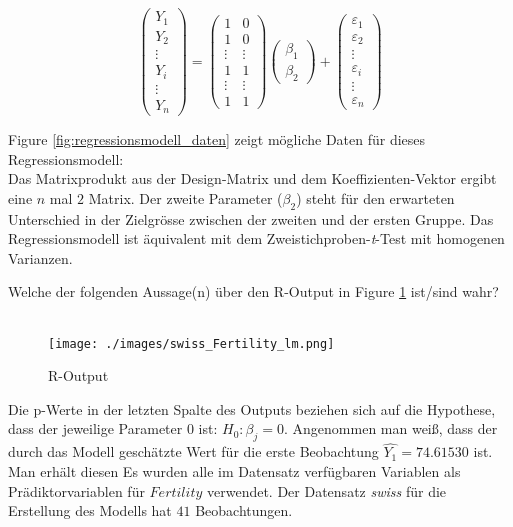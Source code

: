 \documentclass[10pt,addpoints]{exam}
\begin{document}
\begin{questions}
\[
\begin{pmatrix}
Y_1 \\
Y_2 \\
\vdots \\
Y_i \\
\vdots \\
Y_n
\end{pmatrix}
=
\begin{pmatrix}
1 & 0 \\
1 & 0 \\
\vdots & \vdots \\
1 & 1 \\
\vdots & \vdots \\
1 & 1
\end{pmatrix}
\begin{pmatrix}
\beta_1 \\
\beta_2
\end{pmatrix}
+
\begin{pmatrix}
\varepsilon_1 \\
\varepsilon_2 \\
\vdots \\
\varepsilon_i \\
\vdots \\
\varepsilon_n
\end{pmatrix}
\]

\begin{choices}
\choice Figure \ref{fig:regressionsmodell_daten} zeigt mögliche Daten für dieses Regressionsmodell:\\
\choice Das Matrixprodukt aus der Design-Matrix und dem Koeffizienten-Vektor ergibt eine $n$ mal $2$ Matrix.
\CorrectChoice Der zweite Parameter ($\beta_2$) steht für den erwarteten Unterschied in der Zielgrösse zwischen der zweiten und der ersten Gruppe.
\CorrectChoice Das Regressionsmodell ist äquivalent mit dem Zweistichproben-\textit{t}-Test mit homogenen Varianzen.
\end{choices}

\question Welche der folgenden Aussage(n) über den R-Output in Figure \ref{fig:regression_fertility} ist/sind wahr?\\
\\
\begin{figure}[H]
\centering
\texttt{[image: ./images/swiss\_Fertility\_lm.png]}
\caption{R-Output}
\label{fig:regression_fertility}
\end{figure}

\begin{choices}
\CorrectChoice Die p-Werte in der letzten Spalte des Outputs beziehen sich auf die Hypothese, dass der jeweilige Parameter 0 ist: $H_0: \beta_j = 0$.
\choice Angenommen man weiß, dass der durch das Modell geschätzte Wert für die erste Beobachtung $\hat{Y_1} = 74.61530$ ist. Man erhält diesen
\CorrectChoice Es wurden alle im Datensatz verfügbaren Variablen als Prädiktorvariablen für $Fertility$ verwendet.
\choice Der Datensatz \textit{swiss} für die Erstellung des Modells hat $41$ Beobachtungen. 
\end{choices}


\end{questions}
\end{document}
